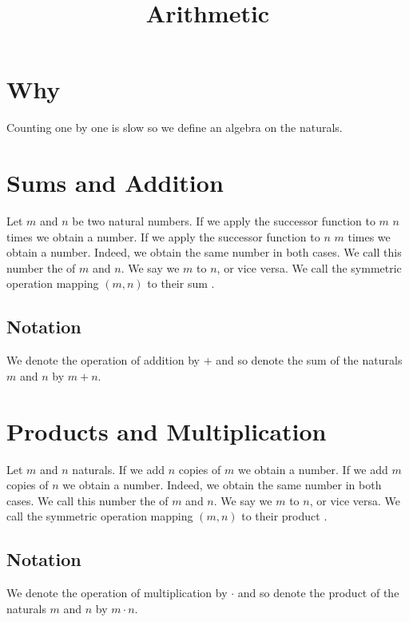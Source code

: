 






\title{Arithmetic}

\section{Why}

Counting one by one is slow so we define an algebra on the naturals.

\section{Sums and Addition}

Let $m$ and $n$ be two natural numbers.
If we apply the successor function to $m$ $n$ times we obtain a number.
If we apply the successor function to $n$ $m$ times we obtain a number.
Indeed, we obtain the same number in both cases.
We call this number the  of $m$ and $n$.
We say we  $m$ to $n$, or vice versa.
We call the symmetric operation mapping $(m, n)$ to their sum .

\subsection{Notation}

We denote the operation of addition by $+$ and so denote the sum of the naturals $m$ and $n$ by $m + n$.

\section{Products and Multiplication}

Let $m$ and $n$ naturals.
If we add $n$ copies of $m$ we obtain a number.
If we add $m$ copies of $n$ we obtain a number.
Indeed, we obtain the same number in both cases.
We call this number the  of $m$ and $n$.
We say we  $m$ to $n$, or vice versa.
We call the symmetric operation mapping $(m, n)$ to their product .

\subsection{Notation}

We denote the operation of multiplication by $\cdot$ and so denote the product of the naturals $m$ and $n$ by $m \cdot n$.



